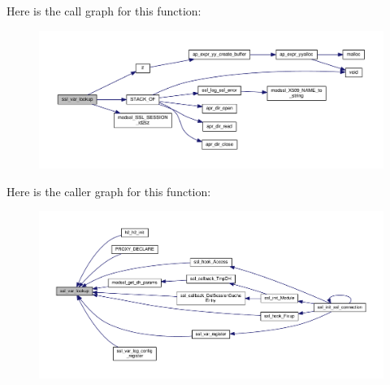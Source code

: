 Here is the call graph for this function\+:
\nopagebreak
\begin{figure}[H]
\begin{center}
\leavevmode
\includegraphics[width=350pt]{group__MOD__SSL__PRIVATE_ga42e6f981345c92e377fc830d91667fa5_cgraph}
\end{center}
\end{figure}




Here is the caller graph for this function\+:
\nopagebreak
\begin{figure}[H]
\begin{center}
\leavevmode
\includegraphics[width=350pt]{group__MOD__SSL__PRIVATE_ga42e6f981345c92e377fc830d91667fa5_icgraph}
\end{center}
\end{figure}



